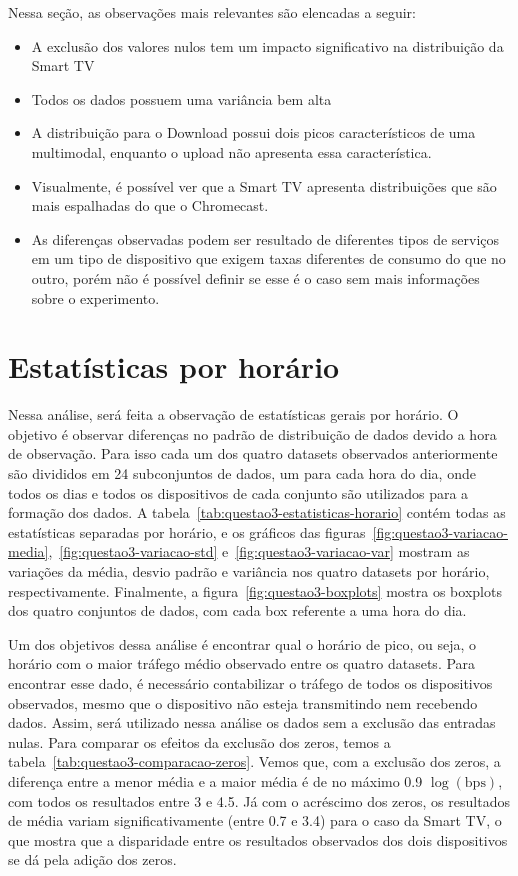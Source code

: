\documentclass{article}
\begin{document}
Nessa seção, as observações mais relevantes são elencadas a seguir:
\begin{itemize}
	\item A exclusão dos valores nulos tem um impacto significativo na distribuição da Smart TV
	\item Todos os dados possuem uma variância bem alta
	\item A distribuição para o Download possui dois picos característicos de uma multimodal, enquanto o upload não apresenta essa característica.
	\item Visualmente, é possível ver que a Smart TV apresenta distribuições que são mais espalhadas do que o Chromecast.
	\item As diferenças observadas podem ser resultado de diferentes tipos de serviços em um tipo de dispositivo que exigem taxas diferentes de consumo do que no outro, porém não é possível definir se esse é o caso sem mais informações sobre o experimento.
\end{itemize}

\section{Estatísticas por horário}
\label{sec:estatistica-horario}

Nessa análise, será feita a observação de estatísticas gerais por horário. O objetivo é observar diferenças no padrão de distribuição de dados devido a hora de observação. Para isso cada um dos quatro datasets observados anteriormente são divididos em 24 subconjuntos de dados, um para cada hora do dia, onde todos os dias e todos os dispositivos de cada conjunto são utilizados para a formação dos dados. A tabela~\ref{tab:questao3-estatisticas-horario} contém todas as estatísticas separadas por horário, e os gráficos das figuras~\ref{fig:questao3-variacao-media},~\ref{fig:questao3-variacao-std} e~\ref{fig:questao3-variacao-var} mostram as variações da média, desvio padrão e variância nos quatro datasets por horário, respectivamente. Finalmente, a figura~\ref{fig:questao3-boxplots} mostra os boxplots dos quatro conjuntos de dados, com cada box referente a uma hora do dia.

Um dos objetivos dessa análise é encontrar qual o horário de pico, ou seja, o horário com o maior tráfego médio observado entre os quatro datasets. Para encontrar esse dado, é necessário contabilizar o tráfego de todos os dispositivos observados, mesmo que o dispositivo não esteja transmitindo nem recebendo dados. Assim, será utilizado nessa análise os dados sem a exclusão das entradas nulas. Para comparar os efeitos da exclusão dos zeros, temos a tabela~\ref{tab:questao3-comparacao-zeros}. Vemos que, com a exclusão dos zeros, a diferença entre a menor média e a maior média é de no máximo 0.9 $\log(\text{bps})$, com todos os resultados entre 3 e 4.5. Já com o acréscimo dos zeros, os resultados de média variam significativamente (entre 0.7 e 3.4) para o caso da Smart TV, o que mostra que a disparidade entre os resultados observados dos dois dispositivos se dá pela adição dos zeros.
\end{document}
